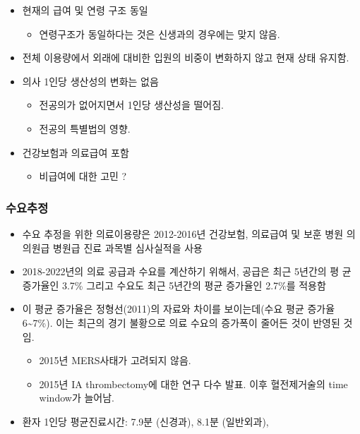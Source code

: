 \documentclass[]{book}
\providecommand{\tightlist}{%
  \setlength{\itemsep}{0pt}\setlength{\parskip}{0pt}}
\begin{document}
\begin{itemize}
\item
  현재의 급여 및 연령 구조 동일

  \begin{itemize}
  \tightlist
  \item
    연령구조가 동일하다는 것은 신생과의 경우에는 맞지 않음.
  \end{itemize}
\item
  전체 이용량에서 외래에 대비한 입원의 비중이 변화하지 않고 현재 상태 유지함.
\item
  의사 1인당 생산성의 변화는 없음

  \begin{itemize}
  \tightlist
  \item
    전공의가 없어지면서 1인당 생산성을 떨어짐.
  \item
    전공의 특별법의 영향.
  \end{itemize}
\item
  건강보험과 의료급여 포함

  \begin{itemize}
  \tightlist
  \item
    비급여에 대한 고민 ?
  \end{itemize}
\end{itemize}

\hypertarget{section-8}{%
\subsubsection{수요추정}\label{section-8}}

\begin{itemize}
\item
  수요 추정을 위한 의료이용량은 2012-2016년 건강보험, 의료급여 및 보훈 병원 의 의원급 병원급 진료 과목별 심사실적을 사용
\item
  2018-2022년의 의료 공급과 수요를 계산하기 위해서, 공급은 최근 5년간의 평 균 증가율인 3.7\% 그리고 수요도 최근 5년간의 평균 증가율인 2.7\%를 적용함
\item
  이 평균 증가율은 정형선(2011)의 자료와 차이를 보이는데(수요 평균 증가율 6\textasciitilde7\%). 이는 최근의 경기 불황으로 의료 수요의 증가폭이 줄어든 것이 반영된 것임.

  \begin{itemize}
  \tightlist
  \item
    2015년 MERS사태가 고려되지 않음.
  \item
    2015년 IA thrombectomy에 대한 연구 다수 발표. 이후 혈전제거술의 time window가 늘어남.
  \end{itemize}
\item
  환자 1인당 평균진료시간: 7.9분 (신경과), 8.1분 (일반외과),
\end{itemize}
\end{document}
